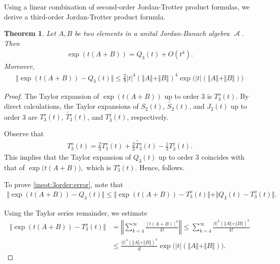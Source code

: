 \documentclass{article}
\theoremstyle{plain} %
\newtheorem{thm}{Theorem}[section]
\numberwithin{equation}{section}
\DeclareMathOperator{\Al}{{\mathcal A}}
\begin{document}
Using a linear combination of second-order Jordan-Trotter product formulas, we derive a third-order Jordan-Trotter product formula.
\begin{thm}\label{thm:3order:product:JordanBanach}
Let $A, B$ be two elements in a unital Jordan-Banach algebra $\Al$. Then 
\begin{align}\label{eqt:3order:lc}
 \exp\left(t(A+B)\right)=Q_3(t)+O(t^4).
\end{align}
Moreover, 
\begin{align}\label{ineqt:3order:error}
\Vert \exp\left(t(A+B)\right)-Q_3(t)\Vert \leq \frac{2}{9}\vert t\vert^4(\Vert A\Vert+\Vert B\Vert)^4\exp\big(\vert t\vert(\Vert A\Vert+\Vert B\Vert) \big)	
\end{align}
\end{thm}

\begin{proof}
The Taylor expansion of $ \displaystyle \exp\left(t(A + B)\right) $ up to order 3 is $\displaystyle T^o_3(t)$. By direct calculations,  the Taylor expansions of $\displaystyle S_2(t)$,  $\displaystyle \widetilde{S_2}(t)$, and $\displaystyle J_2(t)$ up to order 3 are $\displaystyle T^s_3(t)$, $\displaystyle \widetilde{T^s_3}(t)$, and $\displaystyle T^j_3(t)$, respectively.  

Observe that
\begin{align}\label{eqt:T3o:relation}
T^o_3(t)=\frac{2}{3}T^s_3(t)+\frac{2}{3}\widetilde{T^s_3}(t)-\frac{1}{3}T^j_3(t).	
\end{align}
This implies that the Taylor expansion of $\displaystyle Q_3(t)$ up to order 3 coincides with that of $\displaystyle \exp\big(t(A+B)\big),$ which is $T^o_3(t).$ Hence,  follows.

To prove \eqref{ineqt:3order:error}, note that 
\begin{align}\label{ineqt:3order:error1}
\Vert \exp\left(t(A+B)\right)-Q_3(t)\Vert\leq \Vert \exp\left(t(A+B)\right)-T^o_3(t)\Vert+	\Vert Q_3(t)-T_3^o(t) \Vert.
\end{align}

Using the Taylor series remainder, we estimate
\begin{align}
\Vert \exp\left(t(A+B)\right)-T^o_3(t)\Vert&=\left\Vert\sum_{k=4}^{\infty} \frac{[t(A+B)]^k}{k!}\right \Vert\leq \sum_{k=4}^{\infty}\frac{\vert t\vert^k(\Vert A\Vert +\Vert B\Vert )^k}{k!}\nonumber\\
&\leq \frac{\vert t\vert^4(\Vert A\Vert +\Vert B\Vert)^4}{4!}\exp\big(\vert t\vert (\Vert A\Vert +\Vert B\Vert)\big)\label{inqt:T3o}. 	
\end{align}



\end{proof}
\end{document}
